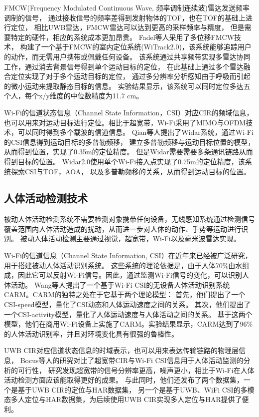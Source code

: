 FMCW(Frequency Modulated Continuous Wave, 频率调制连续波)雷达发送频率调制的信号，
通过接收信号的频率差得到发射物体的TOF，也在TOF的基础上进行定位，
相比UWB雷达，FMCW雷达可以达到更高的采样频率与精度，
但是需要特定的硬件，相应的系统成本更加昂贵。
Fadel等人\cite{Adib_tracking,Adib2015MultiPersonLV}采用了多位移FMCW技术，
构建了一个基于FMCW的室内定位系统(WiTrack2.0)，该系统能够追踪用户的动作，而无需用户携带或佩戴任何设备。
该系统通过共享频带实现多雷达协同工作，通过消去背景信号得到单个运动目标的定位，
在此基础上通过多个雷达融合定位实现了对于多个运动目标的定位，
通过多分辨率分析感知由于呼吸而引起的微小运动来提取静态目标的信息。
实验结果显示，该系统可以同时定位多达五个人，每个x/y维度的中位数精度为11.7 cm。

Wi-Fi的信道状态信息（Channel State Information，CSI）对应CIR的频域信息，
也可以用来对运动目标进行定位。相比于超宽带，Wi-Fi采用了MIMO与OFDM技术，可以同时得到多个载波的信道信息。
Qian等人\cite{Qian}提出了Widar系统，通过Wi-Fi的CSI信息得到运动目标的多普勒频移，
建立多普勒频移与运动目标位置的模型，从而得到位置，实现了0.35m的定位精度。
但是Widar需要需要多条通讯链路从而得到目标的位置。
Widar2.0使用单个Wi-Fi接入点实现了0.75m的定位精度，该系统探索CSI与TOF，AOA，
以及多普勒频移的关系，从而得到运动目标的位置。

\subsection{人体活动检测技术}
被动人体活动检测系统不需要检测对象携带任何设备，无线感知系统通过检测信号覆盖范围内人体活动造成的扰动，从而进一步对人体的动作、手势等运动进行识别。
被动人体活动检测主要通过视觉，超宽带，Wi-Fi以及毫米波雷达实现。

Wi-Fi的信道信息（Channel State Information, CSI）在近年来已经被广泛研究，用于搭建被动人体活动识别系统。
这些系统的理论依据是，由于人体70\%由水组成，因此它可以反射Wi-Fi信号。因此，通过监测Wi-Fi信号的变化，可以识别人体活动。
Wang等人\cite{WiFi_Wang_HAR}提出了一个基于Wi-Fi CSI的无设备人体活动识别系统CARM。CARM的独特之处在于它基于两个理论模型：
首先，他们提出了一个CSI-speed模型，量化了CSI动态和人体运动速度之间的关系。
其次，他们提出了一个CSI-activity模型，量化了人体运动速度与人体活动之间的关系。
基于这两个模型，他们在商用Wi-Fi设备上实施了CARM。实验结果显示，CARM达到了96\%的人体活动识别率，并且对环境变化具有很强的鲁棒性。

UWB CIR对应信道状态信息的时域表示，也可以用来表达传输链路的物理层信息，
Bocus等人\cite{Bocus_comp}的研究对比了超宽带CIR与Wi-Fi CSI信息用于人体活动监测的分析的可行性，
研究发现超宽带的信号分辨率更高，噪声更小，相比于Wi-Fi在人体活动检测方面应该能取得更好的成果。
与此同时，他们还发布了两个数据集，一个是基于UWB CIR的定位与HAR数据集\cite{Bocus_dataset}，
另一个是基于UWB、WiFi CSI的多模态多人定位与HAR数据集\cite{Bocus_dataset_IPL}，为后续使用UWB CIR实现多人定位与HAR提供了便利。

